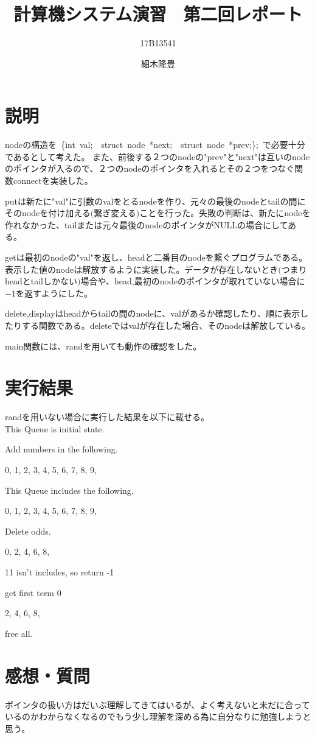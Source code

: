 \documentclass{jarticle}
\title{計算機システム演習　第二回レポート}
\author{17B13541 \and 細木隆豊}
\date{}
\begin{document}
 \maketitle
 
 \section{説明}
 nodeの構造を\ \{int\ val;\ \ struct\ node\ *next;\ \ struct\ node\ *prev;\};\ で必要十分であるとして考えた。
 また、前後する２つのnodeの"prev"と"next"は互いのnodeのポインタが入るので、２つのnodeのポインタを入れるとその２つをつなぐ関数connectを実装した。
 
 putは新たに"val"に引数のvalをとるnodeを作り、元々の最後のnodeとtailの間にそのnodeを付け加える$($繋ぎ変える$)$ことを行った。失敗の判断は、新たにnodeを作れなかった、tailまたは元々最後のnodeのポインタがNULLの場合にしてある。
 
 getは最初のnodeの"val"を返し、headと二番目のnodeを繋ぐプログラムである。表示した値のnodeは解放するように実装した。データが存在しないとき$($つまりheadとtailしかない$)$場合や、head,最初のnodeのポインタが取れていない場合に$-1$を返すようにした。
 
 delete,displayはheadからtailの間のnodeに、valがあるか確認したり、順に表示したりする関数である。deleteではvalが存在した場合、そのnodeは解放している。
 
 main関数には、randを用いても動作の確認をした。
 
 \section{実行結果}
 randを用いない場合に実行した結果を以下に載せる。\\
 
 This Queue is initial state.
 
 Add numbers in the following.
 
 0, 1, 2, 3, 4, 5, 6, 7, 8, 9,
 
 This Queue includes the following.
 
 0, 1, 2, 3, 4, 5, 6, 7, 8, 9,
 
 Delete odds.
 
 0, 2, 4, 6, 8,
 
 11 isn't includes, so return -1
 
 get first term 0
 
 2, 4, 6, 8,
 
 free all.
  
 \section{感想・質問}
 ポインタの扱い方はだいぶ理解してきてはいるが、よく考えないと未だに合っているのかわからなくなるのでもう少し理解を深める為に自分なりに勉強しようと思う。
 
\end{document}
